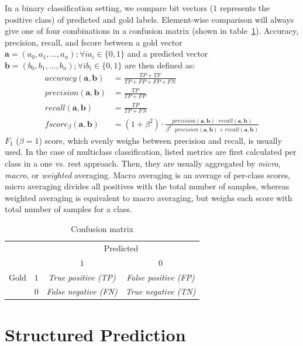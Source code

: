 In a binary classification setting, we compare bit vectors ($1$ represents the
positive class) of predicted and gold labels. Element-wise comparison will
always give one of four combinations in a confusion matrix (shown in
table~\ref{tab:conf_mat}). Accuracy, precision, recall, and fscore between 
a gold vector $\mathbf{a} = (a_0, a_1, \dots, a_n); \forall i a_i \in \{0, 1\}$ 
and a predicted vector 
$\mathbf{b} = (b_0, b_1, \dots, b_n); \forall i b_i \in \{0, 1\}$
are then defined as:
\begin{align*}
	accuracy(\mathbf{a, b}) &= \frac{TP + TF}{TP + FP + FP + FN} \\
	precision(\mathbf{a, b}) &= \frac{TP}{TP + FP} \\
	recall(\mathbf{a, b}) &= \frac{TP}{TP + FN} \\
	fscore_{\beta}(\mathbf{a, b}) &= (1 + \beta^2) 
	\cdot \frac{precision(\mathbf{a, b}) \cdot recall(\mathbf{a, b})}
	{\beta^2 \cdot precision(\mathbf{a, b}) + recall(\mathbf{a, b})}
\end{align*}
$F_1$ ($\beta = 1$) score, which evenly weighs between 
precision and recall, is usually used.
In the case of multiclass classification, listed metrics are first calculated 
per class in a one vs. rest approach. Then, they are usually 
aggregated by
\textit{micro}, \textit{macro}, or \textit{weighted} averaging. Macro
averaging is an average of per-class scores, micro
averaging divides all positives with the total number of 
samples, whereas weighted averaging is equivalent to macro averaging,
but weighs each score with total number of samples for a class. 

\begin{table}
	\centering
	\begin{tabular}{c c|c c}
	\toprule
	& & \multicolumn{2}{c}{Predicted} \\
	\multirow{4}{*}{Gold} & & $1$ & $0$ \\ \hline
	& $1$ & \textit{True positive (TP)} & \textit{False positive (FP)} \\
		& $0$ & \textit{False negative (FN)} & \textit{True negative (TN)} \\
	\bottomrule
\end{tabular}
	\caption{Confusion matrix}
	\label{tab:conf_mat}
\end{table}

\section{Structured Prediction}
\label{sec:struc_machine_learning}

